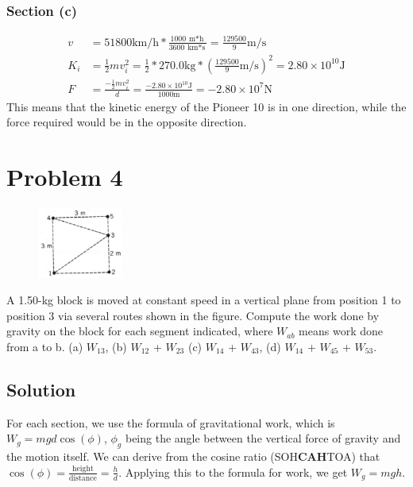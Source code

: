 \documentclass[12pt]{article}
\begin{document}
\subsubsection*{Section (c)}
\begin{align*}
    v   &= 51800 \unit{\kilo\meter/\hour} * \frac{1000\ \unit{\meter*\hour}}{3600\ \unit{\kilo\meter*\second}} 
        = \frac{129500}{9} \unit{\meter/\second}\\
    K_i &= \frac{1}{2}mv_i^2 
        = \frac{1}{2} * 270.0 \unit{\kilo\gram} * \left( \frac{129500}{9} \unit{\meter/\second} \right)^2 
        = 2.80 \times 10^{10} \unit{\joule}\\
    F   &= \frac{-\frac{1}{2}mv_i^2}{d}
        = \frac{-2.80 \times 10^{10} \unit{\joule}}{1000 \unit{\meter}}
        = -2.80 \times 10^7 \unit{\newton}
\end{align*}
This means that the kinetic energy of the Pioneer 10 is  in one direction, while the force required would be  in the opposite direction.

\pagebreak
\section*{Problem 4}

\begin{figure}
    \vspace{-25pt}
    \includegraphics[width=0.25\textwidth]{graph_4.png} 
\end{figure}
A 1.50-kg block is moved at constant speed in a vertical plane from position 1 to position 3 via several routes shown in the figure. Compute the work done by gravity on the block for each segment indicated, where $W_{ab}$ means work done from a to b. (a) $W_{13}$, (b) $W_{12}$ + $W_{23}$ (c) $W_{14}$ + $W_{43}$, (d) $W_{14}$ + $W_{45}$ + $W_{53}$.

\subsection*{Solution}
For each section, we use the formula of gravitational work, which is \( W_g = m g d \cos(\phi) \), $\phi_g$ being the angle between the vertical force of gravity and the motion itself. We can derive from the cosine ratio (SOH\textbf{CAH}TOA) that $\cos(\phi) = \frac{\text{height}}{\text{distance}} = \frac{h}{d}$. Applying this to the formula for work, we get $W_g = mgh$. 
\end{document}
